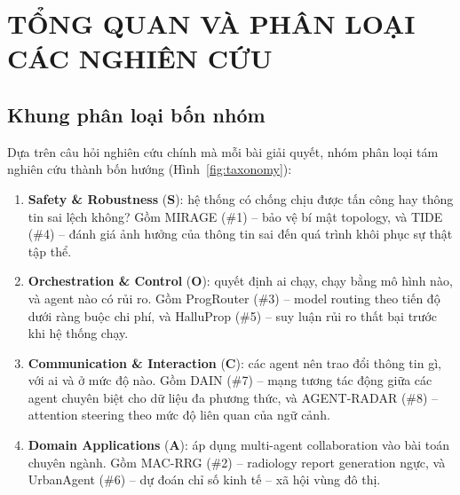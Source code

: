\chapter{TỔNG QUAN VÀ PHÂN LOẠI CÁC NGHIÊN CỨU}
\label{chap:taxonomy}

\section{Khung phân loại bốn nhóm}

Dựa trên câu hỏi nghiên cứu chính mà mỗi bài giải quyết, nhóm phân loại tám nghiên cứu thành bốn hướng (Hình~\ref{fig:taxonomy}):

\begin{enumerate}
  \item \textbf{Safety \& Robustness} (\textcolor{gSafe}{\textbf{S}}): hệ thống có chống chịu được tấn công hay thông tin sai lệch không? Gồm MIRAGE (\#1) -- bảo vệ bí mật topology, và TIDE (\#4) -- đánh giá ảnh hưởng của thông tin sai đến quá trình khôi phục sự thật tập thể.
  \item \textbf{Orchestration \& Control} (\textcolor{gOrch}{\textbf{O}}): quyết định ai chạy, chạy bằng mô hình nào, và agent nào có rủi ro. Gồm ProgRouter (\#3) -- model routing theo tiến độ dưới ràng buộc chi phí, và HalluProp (\#5) -- suy luận rủi ro thất bại trước khi hệ thống chạy.
  \item \textbf{Communication \& Interaction} (\textcolor{gComm}{\textbf{C}}): các agent nên trao đổi thông tin gì, với ai và ở mức độ nào. Gồm DAIN (\#7) -- mạng tương tác động giữa các agent chuyên biệt cho dữ liệu đa phương thức, và AGENT-RADAR (\#8) -- attention steering theo mức độ liên quan của ngữ cảnh.
  \item \textbf{Domain Applications} (\textcolor{gApp}{\textbf{A}}): áp dụng multi-agent collaboration vào bài toán chuyên ngành. Gồm MAC-RRG (\#2) -- radiology report generation ngực, và UrbanAgent (\#6) -- dự đoán chỉ số kinh tế -- xã hội vùng đô thị.
\end{enumerate}

